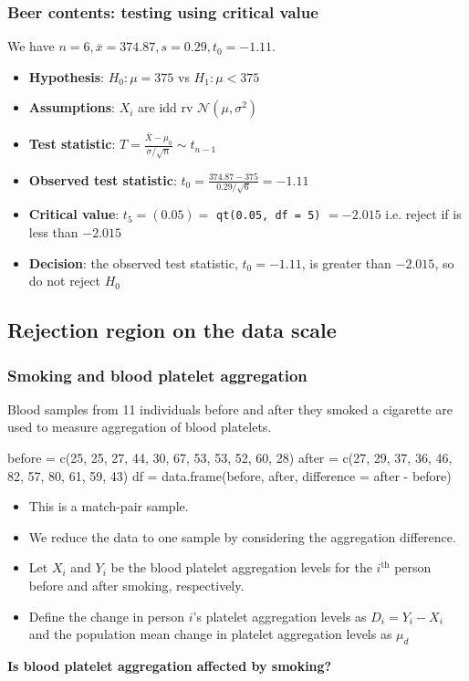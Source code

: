 \documentclass[a4paper]{article}
\begin{document}
\subsubsection{Beer contents: testing using critical value}
We have \( n = 6, \overline{x} = 374.87, s = 0.29, t_0 = -1.11 \).
\begin{itemize}
	\item \textbf{Hypothesis}: \( H_0: \mu = 375 \) vs \( H_1: \mu < 375 \)
	\item \textbf{Assumptions}: \( X_i \) are idd rv \( \mathcal{N}(\mu,\sigma^2) \)
	\item \textbf{Test statistic}: \( T = \frac{\overline{X}-\mu_0}{\sigma/\sqrt{n}} \sim t_{n-1} \)
	\item \textbf{Observed test statistic}: \( t_0 = \frac{374.87 - 375}{0.29 /\sqrt{6}} = -1.11 \)
	\item \textbf{Critical value}: \( t_5 = (0.05) = \)  \lstinline|qt(0.05, df = 5)| \( = -2.015 \) i.e. reject if 
	is less than \( -2.015 \) 
	\item \textbf{Decision}: the observed test statistic, \( t_0 = -1.11 \), is greater than \( -2.015 \), so do not reject \( H_0 \)
\end{itemize}
\subsection{Rejection region on the data scale}
\subsubsection{Smoking and blood platelet aggregation}
Blood samples from 11 individuals before and after they smoked a cigarette are used to measure aggregation of blood platelets.

\begin{Schunk}
\begin{Sinput}
before = c(25, 25, 27, 44, 30, 67, 53, 53, 52, 60, 28)
after =  c(27, 29, 37, 36, 46, 82, 57, 80, 61, 59, 43)
df = data.frame(before, after, difference = after - before)
\end{Sinput}
\end{Schunk}
\begin{itemize}
	\item This is a match-pair sample.
	\item We reduce the data to one sample by considering the aggregation difference.
	\item Let \( X_i \) and \( Y_i \) be the blood platelet aggregation levels for the \( i^{\text{th}} \) person before and after smoking, respectively.
	\item Define the change in person \( i \)'s platelet aggregation levels as \( D_i = Y_i - X_i \) and the population mean change in platelet aggregation levels as \( \mu_d \) 
\end{itemize}
\begin{greenbox}
	\textbf{Is blood platelet aggregation affected by smoking?}
\end{greenbox}
\end{document}
